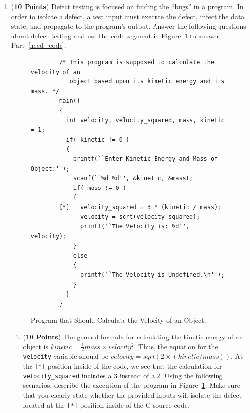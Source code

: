 \documentclass[12pt,epsf,psfig,graphics]{article}
\begin{document}
\begin{enumerate}
\newpage

\item ({\bf 10 Points}) Defect testing is focused on finding the
  ``bugs'' in a program.  In order to isolate a defect, a test input
  must execute the defect, infect the data state, and propagate to the
  program's output.  Answer the following questions about defect
  testing and use the code segment in Figure~\ref{pie_code} to answer
  Part~\ref{need_code}.

\begin{figure}[h]

\footnotesize{
\begin{verbatim}
        /* This program is supposed to calculate the velocity of an
           object based upon its kinetic energy and its mass. */
        main() 
        {
          int velocity, velocity_squared, mass, kinetic = 1;
          if( kinetic != 0 ) 
          {
            printf(``Enter Kinetic Energy and Mass of Object:'');
            scanf(``%d %d'', &kinetic, &mass);
            if( mass != 0 ) 
            {
        [*]   velocity_squared = 3 * (kinetic / mass);
              velocity = sqrt(velocity_squared);
              printf(``The Velocity is: %d'', velocity); 
            }
            else 
            {
              printf(``The Velocity is Undefined.\n'');
            }
          }
        }
\end{verbatim} }

\vspace*{-.2in}

\caption{Program that Should Calculate the Velocity of an Object.}
\label{pie_code}
\end{figure}

\begin{enumerate}

\item \label{need_code} ({\bf 10 Points}) The general formula for
  calculating the kinetic energy of an object is \(
  kinetic=\frac{1}{2}mass\times velocity^2 \).  Thus, the equation for
  the {\tt velocity} variable should be \( velocity=sqrt(2 \times
  (kinetic / mass)) \).  At the {\tt [*]} position inside of the code,
  we see that the calculation for {\tt velocity\_squared} includes a
  $3$ instead of a $2$.  Using the following scenarios, describe the
  execution of the program in Figure~\ref{pie_code}.  Make sure that
  you clearly state whether the provided inputs will isolate the
  defect located at the {\tt [*]} position inside of the C source
  code.


\end{enumerate}
\end{enumerate}
\end{document}
